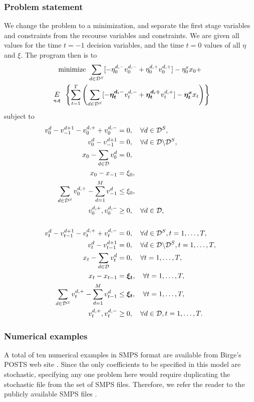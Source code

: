 \subsubsection{Problem statement}
We change the problem to a minimization, and separate the first stage variables and constraints from the recourse variables and constraints.  We are given all values for the time $t=-1$ decision variables, and the time $t=0$ values of all $\eta$ and $\xi$.  The program then is to
\begin{multline*}
\text{minimize } \sum_{d \in {\cal D}^S}[-\eta_0^{d,-} v_0^{d,- } + \eta_0^{d,+} v_0^{d,+}] - \eta_0^x x_0 + \\
\expect[\eta, \xi] \left\{\sum_{t=1}^T \left(\sum_{d\in {\cal D}^S} [-\rand{\eta_t^{d,-}}v_t^{d,-} + \rand{\eta_t^{d,+}}v_t^{d,+}] - \rand{\eta_t^x}x_t \right) \right\}
\end{multline*}
 subject to
{\allowdisplaybreaks
\begin{align}
 v_0^d - v_{-1}^{d+1} - v_0^{d,+} + v_0^{d,-} &=0, \quad \forall d \in {\cal D}^S,\label{BONDS:con1}\\
v_0^d - v_{-1}^{d+1} &=0, \quad \forall d \in {\cal D}\backslash {\cal D}^S,\label{BONDS:con2}\\
x_0 - \sum_{d \in {\cal D}} v_0^d &=0,\notag \\
x_0 - x_{-1} &= \xi_0,\notag \\
\sum_{d \in {\cal D}^S} v_0^{d,+} - \sum_{d=1}^M v_{-1}^d &\leq \xi_0,\label{BONDS:con5}\\
v_0^{d,+}, v_0^{d,-} &\geq 0, \quad \forall d \in {\cal D},\notag \\
\notag \\
 v_t^d - v_{t-1}^{d+1} - v_t^{d,+} + v_t^{d,-} &=0, \quad \forall d \in {\cal D}^S, t=1,\ldots, T,\notag \\
v_t^d - v_{t-1}^{d+1} &=0, \quad \forall d \in {\cal D}\backslash {\cal D}^S, t=1,\ldots, T,\notag \\
x_t - \sum_{d \in {\cal D}} v_t^d &=0, \quad \forall  t=1,\ldots, T, \notag \\
x_t - x_{t-1} &= \mathbf{\boldsymbol{\xi_t}}, \quad \forall  t=1,\ldots, T,\notag \\
\sum_{d \in {\cal D}^S} v_t^{d,+} - \sum_{d=1}^M v_{t-1}^d &\leq \mathbf{\boldsymbol{\xi_t}}, \quad \forall  t=1,\ldots, T,\label{BONDS:con11}\\
v_t^{d,+}, v_t^{d,-} &\geq 0, \quad \forall d \in {\cal D}, t=1, \ldots, T.\notag
\end{align}
}

\subsubsection{Numerical examples}
A total of ten numerical examples in SMPS format \cite{SMPS87} are available from Birge's POSTS web site \cite{postswebsite}.  Since the only coefficients to be specified in this model are stochastic, specifying any one problem here would require duplicating the stochastic file from the set of SMPS files.  Therefore, we refer the reader to the publicly available SMPS files \cite{postswebsite}.


